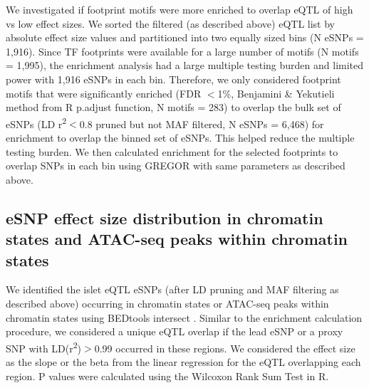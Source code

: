 We investigated if footprint motifs were more enriched to overlap eQTL of high vs low effect sizes. We sorted the filtered (as described above) eQTL list by absolute effect size values and partitioned into two equally sized bins (N eSNPs = 1,916). Since TF footprints were available for a large number of motifs (N motifs = 1,995), the enrichment analysis had a large multiple testing burden and limited power with 1,916 eSNPs in each bin. Therefore, we only considered footprint motifs that were significantly enriched (FDR $<$1\%, Benjamini \& Yekutieli method from R p.adjust function, N motifs = 283) to overlap the bulk set of eSNPs (LD r\textsuperscript{2}$<$0.8 pruned but not MAF filtered, N eSNPs = 6,468) for enrichment to overlap the binned set of eSNPs. This helped reduce the multiple testing burden. We then calculated enrichment for the selected footprints to overlap SNPs in each bin using GREGOR with same parameters as described above.

\subsection{eSNP effect size distribution in chromatin states and ATAC-seq peaks within chromatin states}
We identified the islet eQTL eSNPs (after LD pruning and MAF filtering as described above) occurring in chromatin states or ATAC-seq peaks within chromatin states using BEDtools intersect \cite{quinlanBEDToolsFlexibleSuite2010}. Similar to the enrichment calculation procedure, we considered a unique eQTL overlap if the lead eSNP or a proxy SNP with LD(r\textsuperscript{2})$>$0.99 occurred in these regions. We considered the effect size as the slope or the beta from the linear regression for the eQTL overlapping each region. P values were calculated using the Wilcoxon Rank Sum Test in R.
    
